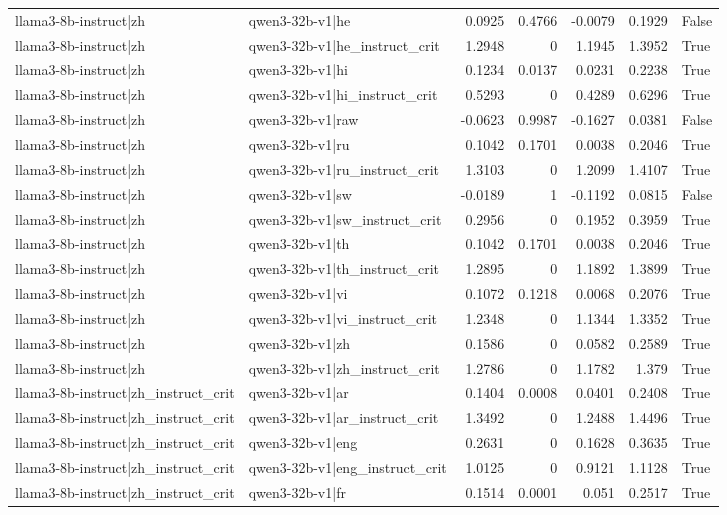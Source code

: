 \begin{table}
\begin{tabular}{l l r r r r l}
llama3-8b-instruct|zh & qwen3-32b-v1|he & 0.0925 & 0.4766 & -0.0079 & 0.1929 & False \\
llama3-8b-instruct|zh & qwen3-32b-v1|he_instruct_crit & 1.2948 & 0 & 1.1945 & 1.3952 & True \\
llama3-8b-instruct|zh & qwen3-32b-v1|hi & 0.1234 & 0.0137 & 0.0231 & 0.2238 & True \\
llama3-8b-instruct|zh & qwen3-32b-v1|hi_instruct_crit & 0.5293 & 0 & 0.4289 & 0.6296 & True \\
llama3-8b-instruct|zh & qwen3-32b-v1|raw & -0.0623 & 0.9987 & -0.1627 & 0.0381 & False \\
llama3-8b-instruct|zh & qwen3-32b-v1|ru & 0.1042 & 0.1701 & 0.0038 & 0.2046 & True \\
llama3-8b-instruct|zh & qwen3-32b-v1|ru_instruct_crit & 1.3103 & 0 & 1.2099 & 1.4107 & True \\
llama3-8b-instruct|zh & qwen3-32b-v1|sw & -0.0189 & 1 & -0.1192 & 0.0815 & False \\
llama3-8b-instruct|zh & qwen3-32b-v1|sw_instruct_crit & 0.2956 & 0 & 0.1952 & 0.3959 & True \\
llama3-8b-instruct|zh & qwen3-32b-v1|th & 0.1042 & 0.1701 & 0.0038 & 0.2046 & True \\
llama3-8b-instruct|zh & qwen3-32b-v1|th_instruct_crit & 1.2895 & 0 & 1.1892 & 1.3899 & True \\
llama3-8b-instruct|zh & qwen3-32b-v1|vi & 0.1072 & 0.1218 & 0.0068 & 0.2076 & True \\
llama3-8b-instruct|zh & qwen3-32b-v1|vi_instruct_crit & 1.2348 & 0 & 1.1344 & 1.3352 & True \\
llama3-8b-instruct|zh & qwen3-32b-v1|zh & 0.1586 & 0 & 0.0582 & 0.2589 & True \\
llama3-8b-instruct|zh & qwen3-32b-v1|zh_instruct_crit & 1.2786 & 0 & 1.1782 & 1.379 & True \\
llama3-8b-instruct|zh_instruct_crit & qwen3-32b-v1|ar & 0.1404 & 0.0008 & 0.0401 & 0.2408 & True \\
llama3-8b-instruct|zh_instruct_crit & qwen3-32b-v1|ar_instruct_crit & 1.3492 & 0 & 1.2488 & 1.4496 & True \\
llama3-8b-instruct|zh_instruct_crit & qwen3-32b-v1|eng & 0.2631 & 0 & 0.1628 & 0.3635 & True \\
llama3-8b-instruct|zh_instruct_crit & qwen3-32b-v1|eng_instruct_crit & 1.0125 & 0 & 0.9121 & 1.1128 & True \\
llama3-8b-instruct|zh_instruct_crit & qwen3-32b-v1|fr & 0.1514 & 0.0001 & 0.051 & 0.2517 & True \\

\end{tabular}
\end{table}
